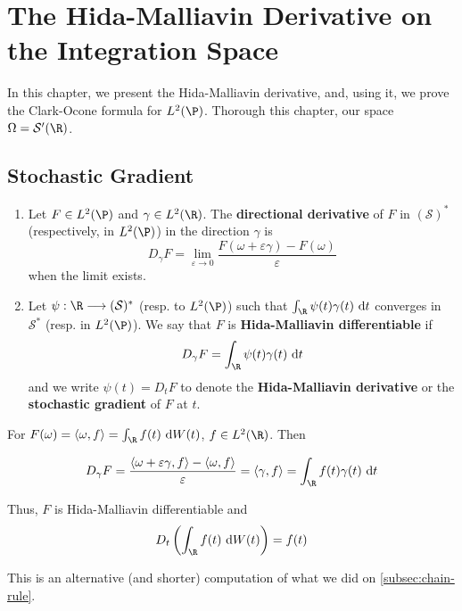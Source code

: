 \chapter{The Hida-Malliavin Derivative on the Integration Space}

In this chapter, we present the Hida-Malliavin derivative, and, using it, we prove the Clark-Ocone formula for $L^2(\P)$. Thorough this chapter, our space $\Omega = \mathcal{S}'(\R)$. 

\section{Stochastic Gradient}

\begin{definition}

\begin{enumerate}
  \item Let $F \in L^2(\P)$ and $\gamma \in L^2(\R)$. The \textbf{directional derivative} of $F$ in $(\mathcal{S})^\ast$ (respectively, in $L^2(\P)$) in the direction $\gamma$ is 
\[
D_\gamma F = \lim_{\varepsilon \to 0} \frac{F(\omega + \varepsilon \gamma) - F(\omega)}{\varepsilon}
\]
when the limit exists. 

\item Let $\psi : \R \longrightarrow (\mathcal{S})^\ast$ (resp. to $L^2(\P)$) such that 
  $ \int_\R \psi(t) \gamma(t) ~\mathrm{d}t$ converges in $\mathcal{S}^\ast$ (resp. in $L^2(\P)$). We say that $F$ is \textbf{Hida-Malliavin differentiable} if
  \[
  D_\gamma F = \int_\R \psi(t) \gamma(t) ~\mathrm{d}t
  \]
  and we write $\psi(t) = D_t F$ to denote the \textbf{Hida-Malliavin derivative} or the \textbf{stochastic gradient} of $F$ at $t$.
  \end{enumerate}

  \end{definition}

\begin{example}
  For $F(\omega) = \langle \omega, f \rangle = \int_\R f(t) ~\mathrm{d}W(t)$, $f \in L^2(\R)$. Then 

  \[
    D_\gamma F = \frac{\langle \omega + \varepsilon \gamma, f \rangle - \langle \omega, f \rangle}{\varepsilon} =\langle \gamma, f \rangle = \int_\R f(t) \gamma(t) ~\mathrm{d}t
  \]

  Thus, $F$ is Hida-Malliavin differentiable and 
  \[
    D_t \left( \int_\R f(t) ~\mathrm{d}W(t) \right) = f(t)
  \]
  
  This is an alternative (and shorter) computation of what we did on \ref{subsec:chain-rule}.
\end{example}

